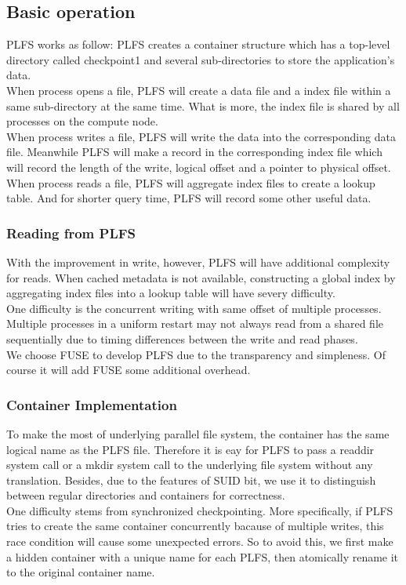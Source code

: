 \documentclass[conference]{IEEEtran}
\begin{document}
\subsection{Basic operation}
PLFS works as follow: PLFS creates a container structure which has a top-level directory called checkpoint1 and several sub-directories to store the application's data.
\\When process opens a file, PLFS will create a data file and a index file within a same sub-directory at the same time. What is more, the index file is shared by all processes on the compute node. 
\\When process writes a file, PLFS will write the data into the corresponding data file. Meanwhile PLFS will make a record in the corresponding index file which will record the length of the write, logical offset and a pointer to physical offset.
\\When process reads a file, PLFS will aggregate index files to create a lookup table. And for shorter query time, PLFS will record some other useful data.
\subsubsection{Reading from PLFS}
With the improvement in write, however, PLFS will have additional complexity for reads. When cached metadata is not available, constructing a global index by aggregating index files into a lookup table will have severy difficulty.
\\One difficulty is the concurrent writing with same offset of multiple processes.
Multiple processes in a uniform restart may not always read from a shared file sequentially due to timing differences between the write and read phases.
\\We choose FUSE to develop PLFS due to the transparency and simpleness. Of course it will add FUSE some additional overhead.
\subsubsection{Container Implementation}
To make the most of underlying parallel file system, the container has the same logical name as the PLFS file. Therefore it is eay for PLFS to pass a readdir system call or a mkdir system call to the underlying file system without any translation. Besides, due to the features of SUID bit, we use it to distinguish between regular directories and containers for correctness.
\\One difficulty stems from synchronized checkpointing. More specifically, if PLFS tries to create the same container concurrently bacause of multiple writes, this race condition will cause some unexpected errors. So to avoid this, we first make a hidden container with a unique name for each PLFS, then atomically rename it to the original container name.
\end{document}
